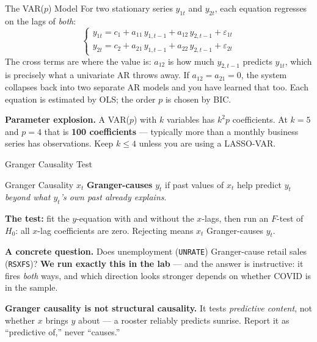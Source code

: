 \documentclass[aspectratio=169, 11pt]{beamer}
\begin{document}
\begin{frame}{The VAR($p$) Model}
  For two stationary series $y_{1t}$ and $y_{2t}$, each equation regresses on the lags of
  \emph{both}:
  \[
    \begin{cases}
      y_{1t} = c_1 + a_{11}\,y_{1,t-1} + a_{12}\,y_{2,t-1} + \varepsilon_{1t}\\[2pt]
      y_{2t} = c_2 + a_{21}\,y_{1,t-1} + a_{22}\,y_{2,t-1} + \varepsilon_{2t}
    \end{cases}
  \]
  The cross terms are where the value is: $a_{12}$ is how much $y_{2,t-1}$ predicts $y_{1t}$,
  which is precisely what a univariate AR throws away. If $a_{12} = a_{21} = 0$, the system
  collapses back into two separate AR models and you have learned that too.
  Each equation is estimated by OLS; the order $p$ is chosen by BIC.
  \begin{warningbox}
    \textbf{Parameter explosion.} A VAR($p$) with $k$ variables has $k^2 p$ coefficients.
    At $k=5$ and $p=4$ that is \textbf{100 coefficients} --- typically more than a monthly
    business series has observations. Keep $k \leq 4$ unless you are using a LASSO-VAR.
  \end{warningbox}
\end{frame}

\begin{frame}{Granger Causality Test}
  \begin{definitionbox}{Granger Causality}
    $x_t$ \textbf{Granger-causes} $y_t$ if past values of $x_t$ help predict $y_t$
    \emph{beyond what $y_t$'s own past already explains}.
  \end{definitionbox}
  \textbf{The test:} fit the $y$-equation with and without the $x$-lags, then run an
  $F$-test of $H_0$: all $x$-lag coefficients are zero. Rejecting means $x_t$
  Granger-causes $y_t$.

  \vspace{0.1cm}
  \textbf{A concrete question.} Does unemployment (\texttt{UNRATE}) Granger-cause retail
  sales (\texttt{RSXFS})? \textbf{We run exactly this in the lab} --- and the answer is
  instructive: it fires \emph{both} ways, and which direction looks stronger depends on
  whether COVID is in the sample.

  \vspace{0.15cm}
  \textbf{Granger causality is not structural causality.} It tests \emph{predictive
  content}, not whether $x$ brings $y$ about --- a rooster reliably predicts sunrise.
  Report it as ``predictive of,'' never ``causes.''

\end{frame}
\end{document}
